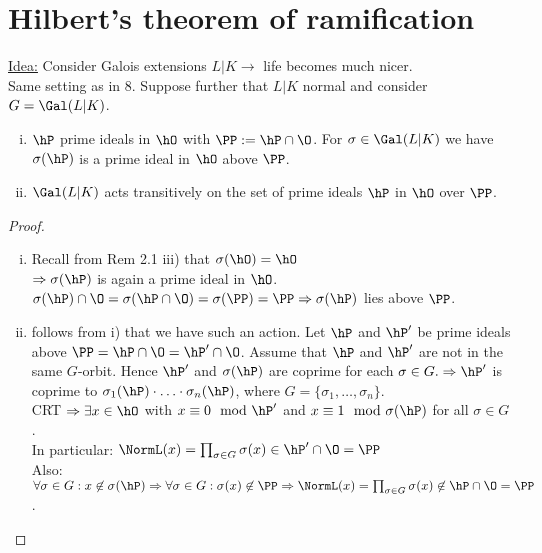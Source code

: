 \section{Hilbert's theorem of ramification}
\underline{Idea:} Consider Galois extensions $L|K \to $ life becomes much nicer.\\
Same setting as in 8. Suppose further that $L|K$ normal and consider $G=\Gal(L|K)$.

\begin{Bem}
\begin{enumerate}[i)]
\item $\hP$ prime ideals in $\hO$ with $\PP:=\hP \cap \O$. For $\sigma \in \Gal(L|K)$ we have $\sigma(\hP)$ is a prime ideal in $\hO$ above $\PP$.
\item $\Gal(L|K)$ acts transitively on the set of prime ideals $\hP$ in $\hO$ over $\PP$.
\end{enumerate}
\end{Bem}

\begin{proof}
\begin{enumerate}[i)]
\item Recall from Rem 2.1 iii) that $\sigma(\hO) = \hO$\\
$\Rightarrow \sigma(\hP)$ is again a prime ideal in $\hO$.\\
$\sigma(\hP) \cap \O = \sigma(\hP \cap \O) = \sigma(\PP) = \PP\\
\Rightarrow \sigma(\hP)$ lies above $\PP$.
\item follows from i) that we have such an action. Let $\hP$ and $\hP'$ be prime ideals above $\PP = \hP \cap \O = \hP' \cap \O$. Assume that $\hP$ and $\hP'$ are not in the same $G$-orbit. Hence $\hP'$ and $\sigma(\hP)$ are coprime for each $\sigma \in G.\\
\Rightarrow \hP'$ is coprime to $\sigma_1(\hP) \cdot \ldots \cdot \sigma_n(\hP)$, where $G= \{\sigma_1, \dots, \sigma_n\}$.\\
CRT $\Rightarrow \exists x \in \hO$ with $x \equiv 0 \mod \hP'$ and $x \equiv 1 \mod \sigma (\hP)$ for all $\sigma \in G$.\\
In particular: $\NormL(x)=\prod_{\sigma \in G} \sigma(x) \in \hP' \cap \O = \PP$\\
Also: $\forall \sigma \in G: x \not\in \sigma(\hP) \Rightarrow \forall \sigma \in G: \sigma(x) \not\in \PP\\
 \Rightarrow \NormL(x)=\prod_{\sigma \in G} \sigma(x) \not\in \hP \cap \O = \PP$ \Lightning.
\end{enumerate}
\end{proof}

